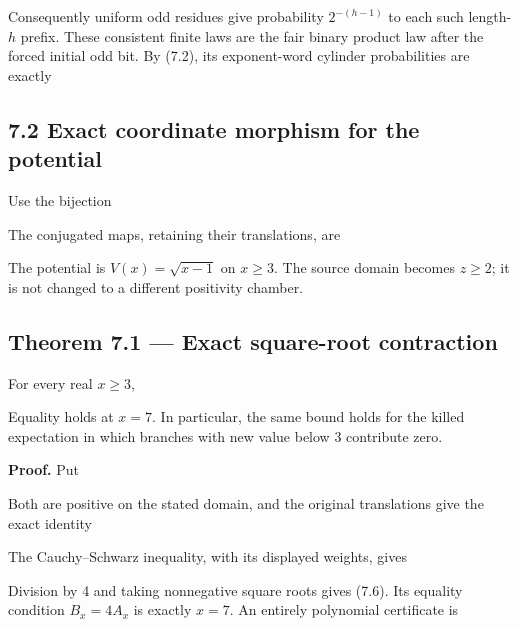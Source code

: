 Consequently uniform odd residues give probability \(2^{-(h-1)}\) to
each such length-\(h\) prefix. These consistent finite laws are the fair
binary product law after the forced initial odd bit. By (7.2), its
exponent-word cylinder probabilities are exactly


\subsection{7.2 Exact coordinate morphism for the potential}

Use the bijection


The conjugated maps, retaining their translations, are


The potential is \(V(x)=\sqrt{x-1}\) on \(x\ge3\). The source domain
becomes \(z\ge2\); it is not changed to a different positivity chamber.

\subsection{Theorem 7.1 --- Exact square-root contraction}

For every real \(x\ge3\),


Equality holds at \(x=7\). In particular, the same bound holds for the
killed expectation in which branches with new value below 3 contribute
zero.

\textbf{Proof.} Put


Both are positive on the stated domain, and the original translations
give the exact identity


The Cauchy--Schwarz inequality, with its displayed weights, gives


Division by 4 and taking nonnegative square roots gives (7.6). Its
equality condition \(B_x=4A_x\) is exactly \(x=7\). An entirely
polynomial certificate is

